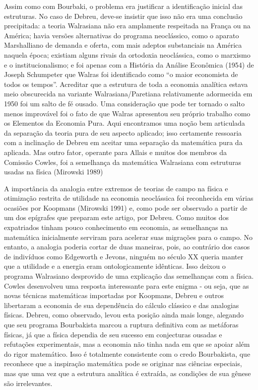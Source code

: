 \documentclass[12pt]{article}
\begin{document}
Assim como com Bourbaki, o problema era justificar a identificação inicial das estruturas. No caso de Debreu, deve-se insistir que isso não era uma conclusão precipitada: a teoria Walrasiana não era amplamente respeitada na França ou na América; havia versões alternativas do programa neoclássico, como o aparato Marshalliano de demanda e oferta, com mais adeptos substanciais na América naquela época; existiam alguns rivais da ortodoxia neoclássica, como o marxismo e o institucionalismo; e foi apenas com a História da Análise Econômica (1954) de Joseph Schumpeter que Walras foi identificado como “o maior economista de todos os tempos”. Acreditar que a estrutura de toda a economia analítica estava meio obscurecida na variante Walrasiana/Paretiana relativamente adormecida em 1950 foi um salto de fé ousado. Uma consideração que pode ter tornado o salto menos improvável foi o fato de que Walras apresentou seu próprio trabalho como os Elementos da Economia Pura. Aqui encontramos uma noção bem articulada da separação da teoria pura de seu aspecto aplicado; isso certamente ressoaria com a inclinação de Debreu em aceitar uma separação da matemática pura da aplicada. Mas outro fator, operante para Allais e muitos dos membros da Comissão Cowles, foi a semelhança da matemática Walrasiana com estruturas usadas na física (Mirowski 1989)

A importância da analogia entre extremos de teorias de campo na física e otimização restrita de utilidade na economia neoclássica foi reconhecida em várias ocasiões por Koopmans (Mirowski 1991) e, como pode ser observado a partir de um dos epígrafes que preparam este artigo, por Debreu. Como muitos dos expatriados tinham pouco conhecimento em economia, as semelhanças na matemática inicialmente serviram para acelerar suas migrações para o campo. No entanto, a analogia poderia cortar de duas maneiras, pois, ao contrário dos casos de indivíduos como Edgeworth e Jevons, ninguém no século XX queria manter que a utilidade e a energia eram ontologicamente idênticas. Isso deixou o programa Walrasiano desprovido de uma explicação das semelhanças com a física. Cowles desenvolveu uma resposta interessante para este enigma - ou seja, que as novas técnicas matemáticas importadas por Koopmans, Debreu e outros libertaram a economia de sua dependência do cálculo clássico e das analogias físicas. Debreu, como observado, levou esta posição ainda mais longe, alegando que seu programa Bourbakista marcou a ruptura definitiva com as metáforas físicas, já que a física dependia de seu sucesso em conjecturas ousadas e refutações experimentais, mas a economia não tinha nada em que se apoiar além do rigor matemático. Isso é totalmente consistente com o credo Bourbakista, que reconhece que a inspiração matemática pode se originar nas ciências especiais, mas que uma vez que a estrutura analítica é extraída, as condições de sua gênese são irrelevantes.
\end{document}
